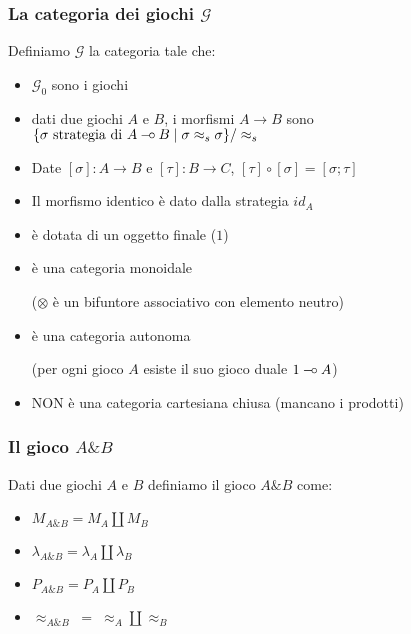 \documentclass{beamer}
\newcommand{\limp}{\mathbin{{-}\mkern-3.5mu{\circ}}}
\begin{document}
\begin{frame}
 	
 	\frametitle{La categoria dei giochi $\mathcal{G}$}
 	
 	Definiamo $\mathcal{G}$ la categoria tale che:
 	\begin{itemize}
 		\item<2-> $\mathcal{G}_0$ sono i giochi
 		\item<3-> dati due giochi $A$ e $B$, i morfismi $A\rightarrow B$ sono $\{ \sigma \text{ strategia di } A\limp B \;|\; \sigma \approx_s \sigma \} / \approx_s$
 		\item<4-> Date $[\sigma] : A\rightarrow B$ e $[\tau] : B \rightarrow C$, $[\tau] \circ [\sigma] = [\sigma ; \tau]$
		\item<5-> Il morfismo identico è dato dalla strategia $id_A$
 	\end{itemize}
 	
 	\begin{itemize}
 		\item<7-> è dotata di un oggetto finale ($1$)
 		\item<8-> è una categoria monoidale 
 		
 		($\otimes$ è un bifuntore associativo con elemento neutro)
 		\item<9-> è una categoria autonoma 
 		
 		(per ogni gioco $A$ esiste il suo gioco duale $1 \limp A$)
 		\item<10-> NON è una categoria cartesiana chiusa (mancano i prodotti)
 	\end{itemize}
 	
 \end{frame}

\begin{frame}
	
	\frametitle{Il gioco $A \& B$}
	Dati due giochi $A$ e $B$ definiamo il gioco $A\& B$ come:
	\begin{itemize}
		\item<2-> $M_{A\& B}=M_A \coprod M_B$
		\item<2-> $\lambda_{A\& B}=\lambda_A \coprod \lambda_B$
		\item<2-> $P_{A\& B}=P_A \coprod P_B$
		\item<2-> $\approx_{A\& B} \; = \; \approx_A \coprod \approx_B$ 
	\end{itemize}
	
\end{frame}
\end{document}
